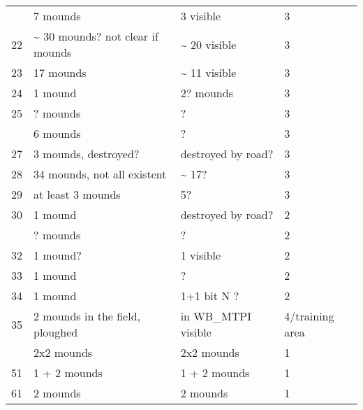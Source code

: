 \documentclass[
]{article}
\begin{document}
\begin{longtable}[t]{rlll}
\addlinespace
21 & 7 mounds & 3 visible & 3\\
22 & \textasciitilde{} 30 mounds? not clear if mounds & \textasciitilde{} 20 visible & 3\\
23 & 17 mounds & \textasciitilde{} 11 visible & 3\\
24 & 1 mound & 2? mounds & 3\\
25 & ? mounds & ? & 3\\
\addlinespace
26 & 6 mounds & ? & 3\\
27 & 3 mounds, destroyed? & destroyed by road? & 3\\
28 & 34 mounds, not all existent & \textasciitilde{} 17? & 3\\
29 & at least 3 mounds & 5? & 3\\
30 & 1 mound & destroyed by road? & 2\\
\addlinespace
31 & ? mounds & ? & 2\\
32 & 1 mound? & 1 visible & 2\\
33 & 1 mound & ? & 2\\
34 & 1 mound & 1+1 bit N ? & 2\\
35 & 2 mounds in the field, ploughed & in WB\_MTPI visible & 4/training area\\
\addlinespace
49 & 2x2 mounds & 2x2 mounds & 1\\
51 & 1 + 2 mounds & 1 + 2 mounds & 1\\
61 & 2 mounds & 2 mounds & 1\\
\bottomrule
\end{longtable}
\end{document}
